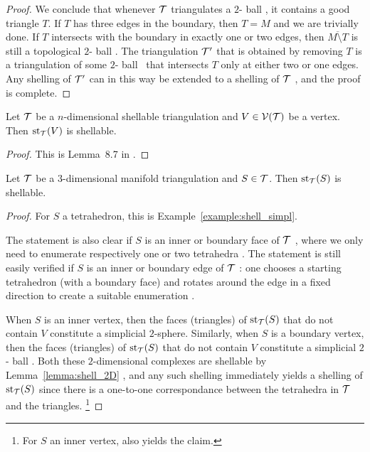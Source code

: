 \documentclass[10pt,letterpaper]{article}
\newcommand\cye[1]{%
  \protect\leavevmode
  \begingroup
    \color{red!35!yellow}%
    #1%
  \endgroup
}
\newcommand{\disk}{\cye{ball}}
\begin{document}
\begin{proof}
    We conclude that whenever ${\mathcal T}$ triangulates a $2$-\disk,
    it contains a good triangle $T$. 
    If $T$ has three edges in the boundary, then $T = M$ and we are trivially done. 
    If $T$ intersects with the boundary in exactly one or two edges, 
    then $\overline{M \setminus T}$ is still a topological $2$-\disk.
    The triangulation ${\mathcal T}'$ that is obtained by removing $T$
    is a triangulation of some $2$-\disk\ that intersects $T$ only at either two or one edges.
    Any shelling of ${\mathcal T}'$ can \cye{in this way} be extended to a shelling of ${\mathcal T}$\cye{, and} the proof is complete. 
\end{proof}

\begin{lemma}\label{lemma:stars_are_shellable}
    Let ${\mathcal T}$ be a $n$-dimensional shellable triangulation and $V \in {\mathcal V}({\mathcal T})$ be a vertex.
    Then $\operatorname{st}_{{\mathcal T}}(V)$ is shellable. 
\end{lemma}
\begin{proof}
    This is Lemma~8.7 in \cite{ziegler1995lectures}.
\end{proof}


\begin{lemma}
    Let ${\mathcal T}$ be a $3$-dimensional manifold triangulation and $S \in {\mathcal T}$.
    Then $\operatorname{st}_{{\mathcal T}}(S)$ is shellable. 
\end{lemma}
\begin{proof}
    \cye{For $S$ a tetrahedron, this is Example~\ref{example:shell_simpl}.}
    The statement is \cye{also} clear if $S$ is an inner or boundary face of ${\mathcal T}$\cye{, where we only need to enumerate respectively one or two tetrahedra}. 
    The statement is \cye{still} easily verified if $S$ is an inner or boundary edge of ${\mathcal T}$\cye{: one chooses a starting tetrahedron (with a boundary face) and rotates around the edge in a fixed direction to create a suitable enumeration}.

    \cye{When $S$ is an inner vertex, then the \cye{faces} (triangles) of $\operatorname{st}_{{\mathcal T}}(S)$ that do not contain $V$ constitute a simplicial $2$-sphere. Similarly, when $S$ is a boundary vertex, then the \cye{faces} (triangles) of $\operatorname{st}_{{\mathcal T}}(S)$ that do not contain $V$ constitute a simplicial $2$-\disk. Both these $2$-dimensional complexes are shellable \cye{by Lemma~\ref{lemma:shell_2D}}, and any such shelling \cye{immediately yields} a shelling of $\operatorname{st}_{{\mathcal T}}(S)$ since there is a one-to-one correspondance between the tetrahedra in ${\mathcal T}$ and the triangles.}\footnote{\cye{For $S$ an inner vertex, \cite[Lemma~B.1]{ern2020stable} also yields the claim.}}
\end{proof}
\end{document}
